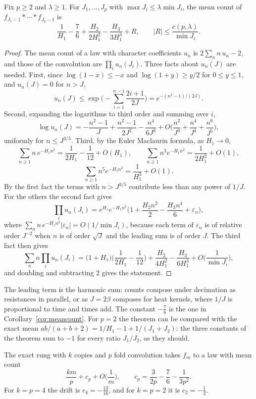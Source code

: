 \begin{theorem}\label{thm:harmonic}
Fix $p\ge2$ and $\lambda\ge1$. For $J_1,\dots,J_p$ with $\max J_i\le\lambda\min J_i$, the mean count of $f_{J_1-1}*\cdots*f_{J_p-1}$ is
\[
\frac1{H_1}-\frac76+\frac{H_2}{2H_1^2}-\frac{H_3}{3H_1^3}+R,\qquad |R|\le\frac{c(p,\lambda)}{\min J_i}.
\]
\end{theorem}

\begin{proof}
The mean count of a law with character coefficients $u_n$ is $2\sum_nn\,u_n-2$, and those of the convolution are $\prod_iu_n(J_i)$. Three facts about $u_n(J)$ are needed. First, since $\log(1-x)\le-x$ and $\log(1+y)\ge y/2$ for $0\le y\le1$, and $u_n(J)=0$ for $n>J$,
\[
u_n(J)\le\exp\Big(-\sum_{i=1}^{n-1}\frac{2i+1}{2J}\Big)=e^{-(n^2-1)/(2J)}.
\]
Second, expanding the logarithms to third order and summing over $i$,
\[
\log u_n(J)=-\frac{n^2-1}{J}+\frac{n^2-1}{2J^2}-\frac{n^4}{6J^3}+O\Big(\frac{n^2}{J^3}+\frac{n^4}{J^4}+\frac{n^6}{J^5}\Big),
\]
uniformly for $n\le J^{3/5}$. Third, by the Euler Maclaurin formula, as $H_1\to0$,
\[
\sum_{n\ge1}n\,e^{-H_1n^2}=\frac1{2H_1}-\frac1{12}+O(H_1),\qquad \sum_{n\ge1}n^3e^{-H_1n^2}=\frac1{2H_1^2}+O(1),
\]
\[
\sum_{n\ge1}n^5e^{-H_1n^2}=\frac1{H_1^3}+O(1).
\]
By the first fact the terms with $n>J^{3/5}$ contribute less than any power of $1/J$. For the others the second fact gives
\[
\prod_iu_n(J_i)=e^{H_1}e^{-H_1n^2}\Big(1+\frac{H_2n^2}{2}-\frac{H_3n^4}{6}+\varepsilon_n\Big),
\]
where $\sum_nn\,e^{-H_1n^2}|\varepsilon_n|=O(1/\min J_i)$, because each term of $\varepsilon_n$ is of relative order $J^{-2}$ when $n$ is of order $\sqrt J$ and the leading sum is of order $J$. The third fact then gives
\[
\sum_nn\prod_iu_n(J_i)=\Big(1+H_1\Big)\Big(\frac1{2H_1}-\frac1{12}\Big)+\frac{H_2}{4H_1^2}-\frac{H_3}{6H_1^3}+O\Big(\frac1{\min J_i}\Big),
\]
and doubling and subtracting $2$ gives the statement.
\end{proof}

The leading term is the harmonic sum: counts compose under decimation as resistances in parallel, or as $J=2\beta$ composes for heat kernels, where $1/J$ is proportional to time and times add. The constant $-\frac76$ is the one in Corollary~\ref{cor:meancount}. For $p=2$ the theorem can be compared with the exact mean $ab/(a+b+2)=1/H_1-1+1/(J_1+J_2)$: the three constants of the theorem sum to $-1$ for every ratio $J_1/J_2$, as they should.

\begin{corollary}\label{cor:pointdrift}
The exact rung with $k$ copies and $p$ fold convolution takes $f_m$ to a law with mean count
\[
\frac{km}{p}+c_p+O\Big(\frac1m\Big),\qquad c_p=\frac{3}{2p}-\frac76-\frac1{3p^2}.
\]
For $k=p=4$ the drift is $c_4=-\frac{13}{16}$, and for $k=p=2$ it is $c_2=-\frac12$.
\end{corollary}

